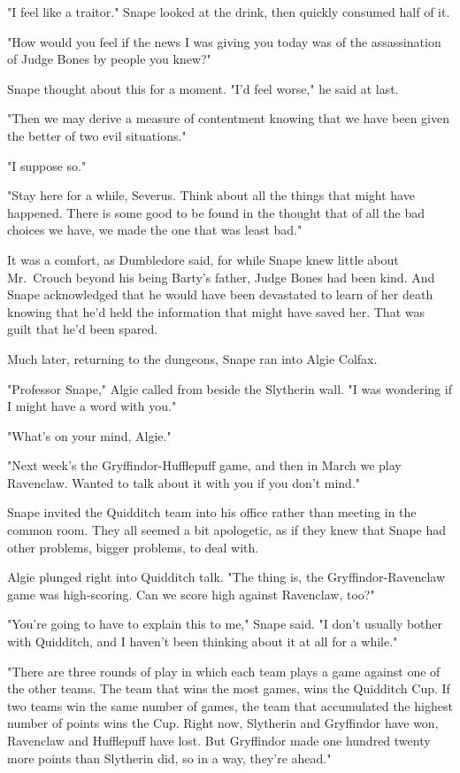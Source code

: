 "I feel like a traitor." Snape looked at the drink, then quickly consumed half of it.

"How would you feel if the news I was giving you today was of the assassination of Judge Bones by people you knew?"

Snape thought about this for a moment. "I'd feel worse," he said at last.

"Then we may derive a measure of contentment knowing that we have been given the better of two evil situations."

"I suppose so."

"Stay here for a while, Severus. Think about all the things that might have happened. There is some good to be found in the thought that of all the bad choices we have, we made the one that was least bad."

It was a comfort, as Dumbledore said, for while Snape knew little about Mr.~Crouch beyond his being Barty's father, Judge Bones had been kind. And Snape acknowledged that he would have been devastated to learn of her death knowing that he'd held the information that might have saved her. That was guilt that he'd been spared.

Much later, returning to the dungeons, Snape ran into Algie Colfax.

"Professor Snape," Algie called from beside the Slytherin wall. "I was wondering if I might have a word with you."

"What's on your mind, Algie."

"Next week's the Gryffindor-Hufflepuff game, and then in March we play Ravenclaw. Wanted to talk about it with you if you don't mind."

Snape invited the Quidditch team into his office rather than meeting in the common room. They all seemed a bit apologetic, as if they knew that Snape had other problems, bigger problems, to deal with.

Algie plunged right into Quidditch talk. "The thing is, the Gryffindor-Ravenclaw game was high-scoring. Can we score high against Ravenclaw, too?"

"You're going to have to explain this to me," Snape said. "I don't usually bother with Quidditch, and I haven't been thinking about it at all for a while."

"There are three rounds of play in which each team plays a game against one of the other teams. The team that wins the most games, wins the Quidditch Cup. If two teams win the same number of games, the team that accumulated the highest number of points wins the Cup. Right now, Slytherin and Gryffindor have won, Ravenclaw and Hufflepuff have lost. But Gryffindor made one hundred twenty more points than Slytherin did, so in a way, they're ahead."

